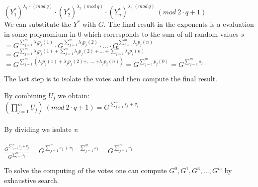 \begin{infobox}
\begin{math}(Y_1^*)^{\lambda_1  \cdot  \ (mod \ q)}  \cdot  (Y_2^*)^{\lambda_2 \ (mod \ q)}  \cdot  (Y_n^*)^{\lambda_n \ (mod \ q)} \ (mod \ 2 \cdot q+1) \end{math}\\


\noindent
We can substitute the $Y^*$ with $G$. The final result in the exponents is a evaluation in some polynomium in $0$ which corresponds to the sum of all random values $s$\\


\noindent
$=G^{ \sum\limits_{j=1}^m \lambda_j p_j(1)} \cdot G^{ \sum\limits_{j=1}^m \lambda_j p_j(2)} \cdot...\cdot G^{ \sum\limits_{j=1}^m \lambda_j p_j(n)} $\\
$=G^{ \sum\limits_{j=1}^m \lambda_j p_j(1) +  \sum\limits_{j=1}^m \lambda_j p_j(2) +...+  \sum\limits_{j=1}^m \lambda_j p_j(n)} $\\
$=G^{ \sum\limits_{j=1}^m (\lambda_j p_j(1)+\lambda_j p_j(2)+,...,+\lambda_{j}p_j(n))} = G^{ \sum\limits_{j=1}^m p_j(0)}= G^{ \sum\limits_{j=1}^m s_j}  $
\end{infobox}



\noindent
The last step is to isolate the votes and then compute the final result.


\noindent
\begin{infobox}
By combining \begin{math}U_j \end{math} we obtain: \\ 
\begin{math} (\prod\limits_{j=1}^{m} U_{j}) \ (mod \ 2 \cdot q+1)=  G^{ \sum\limits_{j=1}^m s_j +v_j}\end{math} \\ \\
By dividing we isolate \textit{v}: \\ \\
\begin{math}\frac{G^{ \sum\limits_{j=1}^m s_j +v_j}}{{ G^{ \sum\limits_{j=1}^m s_j} }} =G^{ \sum\limits_{j=1}^m s_j +v_j -\sum\limits_{j=1}^m s_j} = G^{ \sum\limits_{j=1}^m v_j}  \end{math}
\end{infobox}


 To solve the computing of the votes one can compute \begin{math}G^0, G^1, G^3,..., G^{v_j} \end{math} by exhaustive search. 

